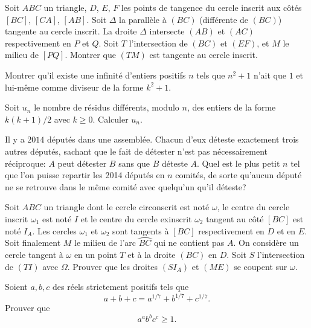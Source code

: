 \begin{exo}{}Soit $ABC$ un triangle, $D$, $E$, $F$ les points de tangence du cercle inscrit aux côtés $[BC]$, $[CA]$, $[AB]$. Soit $\Delta$ la parallèle à $(BC)$ (différente de $(BC)$) tangente au cercle inscrit. La droite $\Delta$ intersecte $(AB)$ et $(AC)$ respectivement en $P$ et $Q$. Soit $T$ l'intersection de $(BC)$ et $(EF)$, et $M$ le milieu de $[PQ]$. Montrer que $(TM)$ est tangente au cercle inscrit. 
\end {exo}

\begin{exo}{}Montrer qu'il existe une infinité d'entiers positifs $n$ tels que $n^2 + 1$ n'ait que $1$ et lui-même comme diviseur de la forme $k^2 + 1$. 
\end{exo}

\begin{exo}{}Soit $u_{n}$ le nombre de résidus différents, modulo $n$, des entiers de la forme $k(k+1)/2$ avec $k \geq 0$. Calculer $u_{n}$.
\end{exo}

\begin{exo}{}Il y a $2014$ députés dans une assemblée. Chacun d'eux déteste exactement trois autres députés, sachant que le fait de détester n'est pas nécessairement réciproque: $A$ peut détester $B$ sans que $B$ déteste $A$. Quel est le plus petit $n$ tel que l'on puisse repartir les 2014 députés en $n$ comités, de sorte qu'aucun député ne se retrouve dans le même comité avec quelqu'un qu'il déteste?
\end{exo}

\begin{exo}{}
Soit $ABC$ un triangle dont le cercle circonscrit est noté $ \omega$, le centre du cercle inscrit $ \omega_{1}$ est noté $I$ et le centre du cercle exinscrit $ \omega_{2}$ tangent au côté $[BC]$ est noté $I_{A}$. Les cercles $ \omega_{1}$ et $ \omega_{2}$ sont tangents à $[BC]$ respectivement en $D$ et en $E$. Soit finalement $M$ le milieu de l'arc $ \wideparen {BC}$ qui ne contient pas $A$. On considère un cercle tangent à $ \omega$ en un point $T$ et à la droite $(BC)$ en $D$. Soit $S$ l'intersection  de $(TI)$ avec $ \Omega$. Prouver que les droites $(SI_{A})$ et $ (ME)$ se coupent sur $ \omega$.
\end{exo}

\begin{exo}{}
Soient $a,b,c$ des réels strictement positifs tels que
$$a+b+c=a^{1/7}+b^{1/7}+c^{1/7}.$$
Prouver que $$a^{a} b^{b} c^{c} \geq 1.$$
\end{exo}


